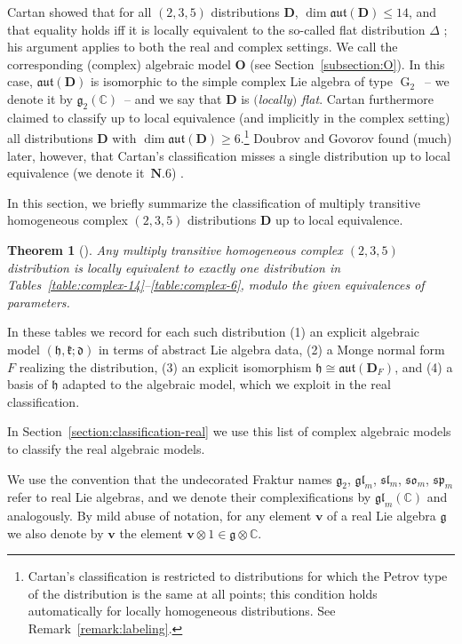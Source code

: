 \documentclass[pdftex]{sigma}
\DeclareMathOperator{\G} {G}
\newcommand{\bbC}{\mathbb{C}}
\newcommand{\mbD}{\mathbf{D}}
\newcommand{\mbO}{\mathbf{O}}
\newcommand{\mbv}{\mathbf{v}}
\newcommand{\mfd} {\mathfrak{d}}
\newcommand{\mfg} {\mathfrak{g}}
\newcommand{\mfh} {\mathfrak{h}}
\newcommand{\mfk} {\mathfrak{k}}
\newcommand{\mfaut}{\mathfrak{aut}}
\newcommand{\mfgl} {\mathfrak{gl}}
\newcommand{\mfsl} {\mathfrak{sl}}
\newcommand{\mfso} {\mathfrak{so}}
\newcommand{\mfsp} {\mathfrak{sp}}
\numberwithin{equation}{section}
\newtheorem{Theorem}{Theorem}[section]
\begin{document}
Cartan showed that for all $(2, 3, 5)$ distributions $\mbD$, $\dim \mfaut(\mbD) \leq 14$, and that equality holds iff it is locally equivalent to the so-called flat distribution $\Delta$ \cite{CartanFiveVariables}; his argument applies to both the real and complex settings. We call the corresponding (complex) algebraic model $\mbO$ (see Section~\ref{subsection:O}). In this case, $\mfaut(\mbD)$ is isomorphic to the simple complex Lie algebra of type $\G_2$~-- we denote it by $\mfg_2(\bbC)$~-- and we say that $\mbD$ is \textit{$($locally$)$ flat}. Cartan furthermore claimed to classify up to local equivalence (and implicitly in the complex setting) all distributions $\mbD$ with $\dim \mfaut(\mbD) \geq 6$.\footnote{Cartan's classification is restricted to distributions for which the Petrov type of the distribution is the same at all points; this condition holds automatically for locally homogeneous distributions. See Remark~\ref{remark:labeling}.\label{footnote:constant-type}} Doubrov and Govorov found (much) later, however, that Cartan's classification misses a single distribution up to local equivalence (we denote it~$\mathbf{N.6}$) \cite{DoubrovGovorovCounterexample, WillseCounterexample}.

In this section, we briefly summarize the classification of multiply transitive homogeneous complex $(2, 3, 5)$ distributions $\mbD$ up to local equivalence.

\begin{Theorem}[\cite{CartanFiveVariables, DoubrovGovorovCounterexample}]\label{theorem:complex-classification}
Any multiply transitive homogeneous complex $(2, 3, 5)$ distribution is locally equivalent to exactly one distribution in Tables~{\rm \ref{table:complex-14}--\ref{table:complex-6}}, modulo the given equivalences of parameters.
\end{Theorem}

In these tables we record for each such distribution (1) an explicit algebraic model $(\mfh, \mfk; \mfd)$ in terms of abstract Lie algebra data, (2) a Monge normal form $F$ realizing the distribution, (3) an explicit isomorphism $\mfh \cong \mfaut(\mbD_F)$, and (4) a basis of $\mfh$ adapted to the algebraic model, which we exploit in the real classification.

In Section~\ref{section:classification-real} we use this list of complex algebraic models to classify the real algebraic models.

We use the convention that the undecorated Fraktur names $\mfg_2$, $\mfgl_m$, $\mfsl_m$, $\mfso_m$, $\mfsp_m$ refer to real Lie algebras, and we denote their complexifications by $\mfgl_m(\bbC)$ and analogously. By mild abuse of notation, for any element $\mbv$ of a real Lie algebra $\mfg$ we also denote by $\mbv$ the element $\mbv \otimes 1 \in \mfg \otimes \bbC$.
\end{document}

